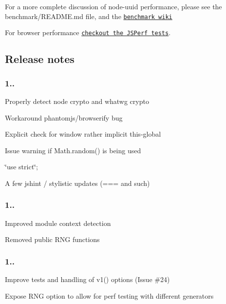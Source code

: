 For a more complete discussion of node-\/uuid performance, please see the {\ttfamily benchmark/\+R\+E\+A\+D\+M\+E.\+md} file, and the \href{https://github.com/broofa/node-uuid/wiki/Benchmark}{\tt benchmark wiki}

For browser performance \href{http://jsperf.com/node-uuid-performance}{\tt checkout the J\+S\+Perf tests}.

\subsection*{Release notes}

\subsubsection*{1..}


\begin{DoxyItemize}
\item Properly detect node crypto and whatwg crypto
\item Workaround phantomjs/browserify bug
\item Explicit check for {\ttfamily window} rather implicit this-\/global
\item Issue warning if Math.\+random() is being used
\item \char`\"{}use strict\char`\"{};
\item A few jshint / stylistic updates (=== and such)
\end{DoxyItemize}

\subsubsection*{1..}


\begin{DoxyItemize}
\item Improved module context detection
\item Removed public R\+NG functions
\end{DoxyItemize}

\subsubsection*{1..}


\begin{DoxyItemize}
\item Improve tests and handling of v1() options (Issue \#24)
\item Expose R\+NG option to allow for perf testing with different generators
\end{DoxyItemize}

